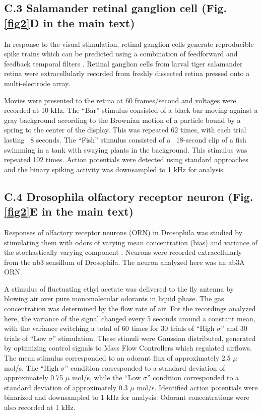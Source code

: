 \subsection*{C.3 Salamander retinal ganglion cell (Fig. \ref{fig2}D in the main text)}
In response to the visual stimulation, retinal ganglion cells generate reproducible spike trains which can be predicted using a combination of feedforward and feedback temporal filters \citep{keat2001predicting, pillow2008spatio}. Retinal ganglion cells from larval tiger salamander retina were extracellularly recorded from freshly dissected retina pressed onto a multi-electrode array. 

Movies were presented to the retina at 60 frames/second and voltages were recorded at 10 kHz. The “Bar” stimulus consisted of a black bar moving against a gray background according to the Brownian motion of a particle bound by a spring to the center of the display. This was repeated 62 times, with each trial lasting ~8 seconds. The “Fish” stimulus consisted of a ~18-second clip of a fish swimming in a tank with swaying plants in the background. This stimulus was repeated 102 times. Action potentials were detected using standard approaches and the binary spiking activity was downsampled to 1 kHz for analysis.

\subsection*{C.4 Drosophila olfactory receptor neuron (Fig. \ref{fig2}E in the main text)}
Responses of olfactory receptor neurons (ORN) in Drosophila was studied by stimulating them with odors of varying mean concentration (bias) and variance of the stochastically varying component \citep{gorur2017olfactory}.  Neurons were recorded extracellularly from the ab3 sensillum of Drosophila. The neuron analyzed here was an ab3A ORN. 

A stimulus of fluctuating ethyl acetate was delivered to the fly antenna by blowing air over pure monomolecular odorants in liquid phase. The gas concentration was determined by the flow rate of air. For the recordings analyzed here, the variance of the signal changed every 5 seconds around a constant mean, with the variance switching a total of 60 times for 30 trials of “High $\sigma$” and 30 trials of “Low $\sigma$” stimulation. These stimuli were Gaussian distributed, generated by optimizing control signals to Mass Flow Controllers which regulated airflows. The mean stimulus corresponded to an odorant flux of approximately 2.5 $\mu$ mol/s. The “High $\sigma$” condition corresponded to a standard deviation of approximately 0.75 $\mu$ mol/s, while the “Low $\sigma$” condition corresponded to a standard deviation of approximately 0.3 $\mu$ mol/s. Identified action potentials were binarized and downsampled to 1 kHz for analysis. Odorant concentrations were also recorded at 1 kHz.

